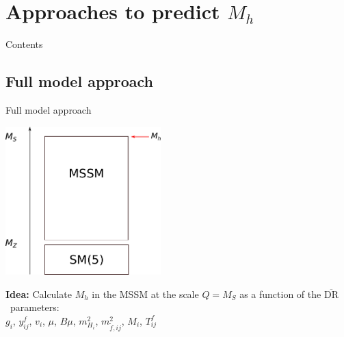 \documentclass[hyperref={pdfpagelabels=false},ngerman]{beamer}
\renewcommand{\emph}{\textbf}
\newcommand{\DRbar}{\ensuremath{\overline{\text{DR}}}}
\begin{document}

\section{Approaches to predict $M_h$}

\begin{frame}{Contents}
  \tableofcontents[currentsection]  
\end{frame}


\subsection{Full model approach}

\begin{frame}{Full model approach}
  \begin{center}
    \includegraphics[width=0.45\textwidth]{images/mssm-sm-tower-diagrammatic}\\[1em]
  \end{center}
  \emph{Idea:} Calculate $M_h$ in the MSSM at the scale $Q = M_S$ as a function of the \DRbar\ parameters:\\[1em]
  \centering $g_i$, $y^f_{ij}$, $v_i$, $\mu$, $B\mu$, $m^2_{H_i}$,
  $m_{\tilde{f},ij}^2$, $M_i$, $T^f_{ij}$
\end{frame}
\end{document}
